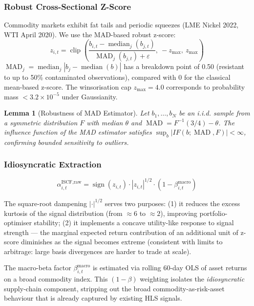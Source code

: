 \documentclass[12pt,a4paper]{article}
\newtheorem{lemma}{Lemma}
\DeclareMathOperator{\MAD}{MAD}\DeclareMathOperator{\rank}{rank}
\DeclareMathOperator{\sign}{sign}\DeclareMathOperator{\clip}{clip}
\begin{document}
\subsubsection{Robust Cross-Sectional Z-Score}

Commodity markets exhibit fat tails and periodic squeezes (LME Nickel 2022, WTI April 2020). We use the MAD-based robust z-score:
\begin{equation}
  z_{i,t} = \clip\!\left(\frac{b_{i,t} - \operatorname{median}_j(b_{j,t})}{\MAD_j(b_{j,t}) + \varepsilon},\ -z_{\max},\ z_{\max}\right)
  \label{eq:robustz}
\end{equation}
$\MAD_j = \operatorname{median}_j|b_j - \operatorname{median}(b)|$ has a breakdown point of 0.50 (resistant to up to 50\% contaminated observations), compared with 0 for the classical mean-based z-score. The winsorisation cap $z_{\max} = 4.0$ corresponds to probability mass $< 3.2 \times 10^{-5}$ under Gaussianity.

\begin{lemma}[Robustness of MAD Estimator]
Let $b_1, \ldots, b_N$ be an i.i.d. sample from a symmetric distribution $F$ with median $\theta$ and $\operatorname{MAD} = F^{-1}(3/4) - \theta$. The influence function of the MAD estimator satisfies $\sup_b |IF(b; \operatorname{MAD}, F)| < \infty$, confirming bounded sensitivity to outliers.
\end{lemma}

\subsubsection{Idiosyncratic Extraction}

\begin{equation}
  \alpha_{i,t}^{\text{ISCF,raw}} = \sign(z_{i,t}) \cdot |z_{i,t}|^{1/2} \cdot (1 - \beta_{i,t}^{\text{macro}})
  \label{eq:iscf_raw}
\end{equation}

The square-root dampening $|\cdot|^{1/2}$ serves two purposes: (1) it reduces the excess kurtosis of the signal distribution (from $\approx 6$ to $\approx 2$), improving portfolio-optimiser stability; (2) it implements a concave utility-like response to signal strength — the marginal expected return contribution of an additional unit of z-score diminishes as the signal becomes extreme (consistent with limits to arbitrage: large basis divergences are harder to trade at scale).

The macro-beta factor $\beta_{i,t}^{\text{macro}}$ is estimated via rolling 60-day OLS of asset returns on a broad commodity index. This $(1-\beta)$ weighting isolates the \emph{idiosyncratic} supply-chain component, stripping out the broad commodity-as-risk-asset behaviour that is already captured by existing HLS signals.
\end{document}
